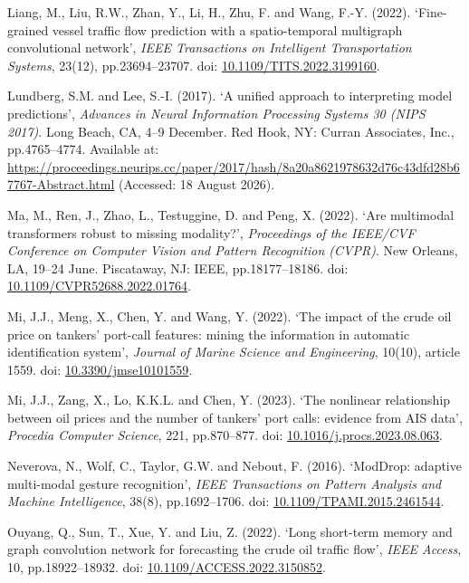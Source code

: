 \documentclass[
  british,
  12pt,
  oneside]{book}
\newlength{\cslhangindent}
\newenvironment{CSLReferences}[2] %
 {\begin{list}{}{%
  \setlength{\itemindent}{0pt}
  \setlength{\leftmargin}{0pt}
  \setlength{\parsep}{0pt}
  \ifodd #1
   \setlength{\leftmargin}{\cslhangindent}
   \setlength{\itemindent}{-1\cslhangindent}
  \fi
  \setlength{\itemsep}{#2\baselineskip}}}
 {\end{list}}
\begin{document}
\begin{CSLReferences}{0}{1}
Liang, M., Liu, R.W., Zhan, Y., Li, H., Zhu, F. and Wang, F.-Y. (2022). {`{Fine-grained vessel traffic flow prediction with a spatio-temporal multigraph convolutional network}'}, \emph{IEEE Transactions on Intelligent Transportation Systems}, 23(12), pp.23694--23707. doi: \href{https://doi.org/10.1109/TITS.2022.3199160}{10.1109/TITS.2022.3199160}.

Lundberg, S.M. and Lee, S.-I. (2017). {`{A unified approach to interpreting model predictions}'}, \emph{{Advances in Neural Information Processing Systems 30 ({NIPS} 2017)}}. Long Beach, CA, 4--9 December. Red Hook, NY: Curran Associates, Inc., pp.4765--4774. Available at: \url{https://proceedings.neurips.cc/paper/2017/hash/8a20a8621978632d76c43dfd28b67767-Abstract.html} (Accessed: 18 August 2026).

Ma, M., Ren, J., Zhao, L., Testuggine, D. and Peng, X. (2022). {`{Are multimodal transformers robust to missing modality?}'}, \emph{{Proceedings of the IEEE/CVF Conference on Computer Vision and Pattern Recognition (CVPR)}}. New Orleans, LA, 19--24 June. Piscataway, NJ: IEEE, pp.18177--18186. doi: \href{https://doi.org/10.1109/CVPR52688.2022.01764}{10.1109/CVPR52688.2022.01764}.

Mi, J.J., Meng, X., Chen, Y. and Wang, Y. (2022). {`{The impact of the crude oil price on tankers' port-call features: mining the information in automatic identification system}'}, \emph{Journal of Marine Science and Engineering}, 10(10), article 1559. doi: \href{https://doi.org/10.3390/jmse10101559}{10.3390/jmse10101559}.

Mi, J.J., Zang, X., Lo, K.K.L. and Chen, Y. (2023). {`{The nonlinear relationship between oil prices and the number of tankers' port calls: evidence from {AIS} data}'}, \emph{Procedia Computer Science}, 221, pp.870--877. doi: \href{https://doi.org/10.1016/j.procs.2023.08.063}{10.1016/j.procs.2023.08.063}.

Neverova, N., Wolf, C., Taylor, G.W. and Nebout, F. (2016). {`{{ModDrop}: adaptive multi-modal gesture recognition}'}, \emph{IEEE Transactions on Pattern Analysis and Machine Intelligence}, 38(8), pp.1692--1706. doi: \href{https://doi.org/10.1109/TPAMI.2015.2461544}{10.1109/TPAMI.2015.2461544}.

Ouyang, Q., Sun, T., Xue, Y. and Liu, Z. (2022). {`{Long short-term memory and graph convolution network for forecasting the crude oil traffic flow}'}, \emph{IEEE Access}, 10, pp.18922--18932. doi: \href{https://doi.org/10.1109/ACCESS.2022.3150852}{10.1109/ACCESS.2022.3150852}.


\end{CSLReferences}
\end{document}
